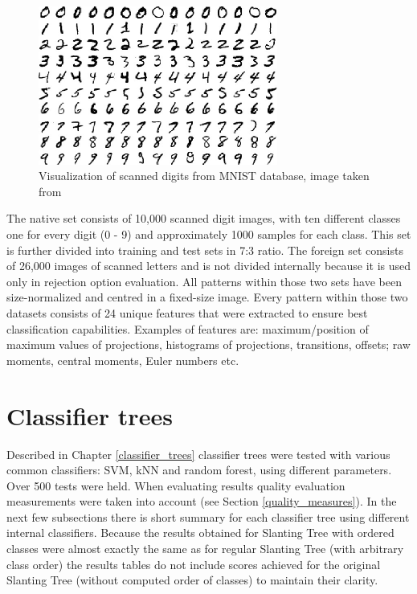 \begin{figure}[htp]
	\centering
	\includegraphics[width=0.7\textwidth]{Figures/mnistdigits.jpg}
	\caption{Visualization of scanned digits from MNIST database, image taken from \cite{Kuan_Hoong_Blog}}
	\label{fig:mnist_digits}\vspace{-3pt}
\end{figure}

The native set consists of 10,000 scanned digit images, with ten different classes one for every digit (0 - 9) and approximately 1000 samples for each class. This set is further divided into training and test sets in 7:3 ratio. The foreign set consists of 26,000 images of scanned letters and is not divided internally because it is used only in rejection option evaluation. All patterns within those two sets have been size-normalized and centred in a fixed-size image. Every pattern within those two datasets consists of 24 unique features that were extracted to ensure best classification capabilities. Examples of features are: maximum/position of maximum values of projections, histograms of projections, transitions, offsets; raw moments, central moments, Euler numbers etc. 

\section{Classifier trees}

Described in Chapter \ref{classifier_trees} classifier trees were tested with various common classifiers: SVM, kNN and random forest, using different parameters. Over 500 tests were held. When evaluating results quality evaluation measurements were taken into account (see Section \ref{quality_measures}). In the next few subsections there is short summary for each classifier tree using different internal classifiers. Because the results obtained for Slanting Tree with ordered classes were almost exactly the same as for regular Slanting Tree (with arbitrary class order) the results tables do not include scores achieved for the original Slanting Tree (without computed order of classes) to maintain their clarity.

